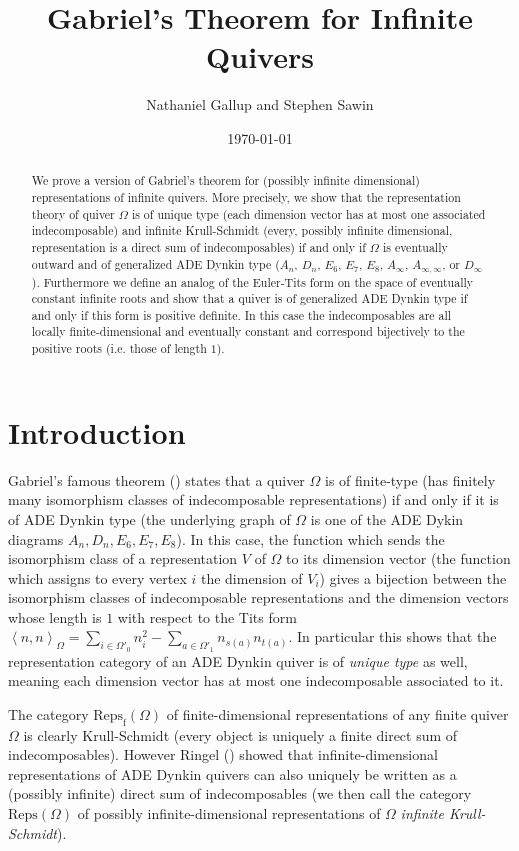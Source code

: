 \documentclass{article}
\title{Gabriel's Theorem for Infinite Quivers}
\author{Nathaniel Gallup and Stephen Sawin}
\date{\today}
\newcommand{\bracket}[1]{\left \langle #1 \right\rangle}
\begin{document}
\maketitle

\begin{abstract}
We prove a version of Gabriel's theorem for (possibly infinite dimensional) representations of infinite quivers. More precisely, we show that the representation theory of  quiver $\Omega$ is of unique type (each dimension vector has at most one associated indecomposable) and infinite Krull-Schmidt (every, possibly infinite dimensional, representation is a direct sum of indecomposables) if and only if $\Omega$ is eventually outward and of generalized ADE Dynkin type ($A_n$, $D_n$, $E_6$, $E_7$, $E_8$, $A_\infty$, $A_{\infty, \infty}$, or $D_\infty$). Furthermore we define an analog of the Euler-Tits form on the space of eventually constant infinite roots and show that a quiver is of generalized ADE Dynkin type if and only if this form is positive definite. In this case the indecomposables are all locally finite-dimensional and eventually constant and correspond bijectively to the positive roots (i.e. those of length $1$). 
\end{abstract} 

\section{Introduction}

Gabriel's famous theorem (\cite{gabriel1972}) states that a quiver $\Omega$ is of finite-type (has finitely many isomorphism classes of indecomposable representations) if and only if it is of ADE Dynkin type (the underlying graph of $\Omega$ is one of the ADE Dykin diagrams $A_n, D_n, E_6, E_7, E_8$). In this case, the function which sends the isomorphism class of a representation $V$ of $\Omega$ to its dimension vector (the function which assigns to every vertex $i$ the dimension of $V_i$) gives a bijection between the isomorphism classes of indecomposable representations and the dimension vectors whose length is $1$ with respect to the Tits form $\bracket{n , n}_\Omega = \sum_{ i \in \Omega'_0} n_i^2 -  \sum_{a \in \Omega'_1}n_{s(a)}n_{t(a)}$. In particular this shows that the representation category of an ADE Dynkin quiver is of \emph{unique type} as well, meaning each dimension vector has at most one indecomposable associated to it. 

The category $\text{Reps}_\text{f}(\Omega)$ of finite-dimensional representations of any finite quiver $\Omega$ is clearly Krull-Schmidt (every object is uniquely a finite direct sum of indecomposables). However Ringel (\cite{ringel2016}) showed that infinite-dimensional representations of ADE Dynkin quivers can also uniquely be written as a (possibly infinite) direct sum of indecomposables (we then call the category $\text{Reps}(\Omega)$ of possibly infinite-dimensional representations of $\Omega$ \emph{infinite Krull-Schmidt}). 
\end{document}
